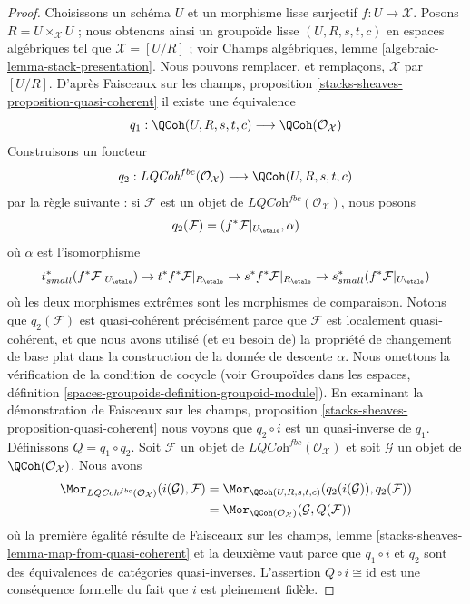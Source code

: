 \begin{proof}
Choisissons un schéma $U$ et un morphisme lisse surjectif $f : U \to \mathcal{X}$.
Posons $R = U \times_\mathcal{X} U$ ; nous obtenons ainsi un groupoïde lisse
$(U, R, s, t, c)$ en espaces algébriques tel que
$\mathcal{X} = [U/R]$ ; voir
Champs algébriques, lemme \ref{algebraic-lemma-stack-presentation}.
Nous pouvons remplacer, et remplaçons, $\mathcal{X}$ par $[U/R]$. D'après
Faisceaux sur les champs, proposition \ref{stacks-sheaves-proposition-quasi-coherent}
il existe une équivalence
$$
q_1 :
\QCoh(U, R, s, t, c)
\longrightarrow
\QCoh(\mathcal{O}_\mathcal{X})
$$
Construisons un foncteur
$$
q_2 :
\textit{LQCoh}^{fbc}(\mathcal{O}_\mathcal{X})
\longrightarrow
\QCoh(U, R, s, t, c)
$$
par la règle suivante : si $\mathcal{F}$ est un objet de
$\textit{LQCoh}^{fbc}(\mathcal{O}_\mathcal{X})$, nous posons
$$
q_2(\mathcal{F}) = (f^*\mathcal{F}|_{U_\etale}, \alpha)
$$
où $\alpha$ est l'isomorphisme
$$
t_{small}^*(f^*\mathcal{F}|_{U_\etale})
\to
t^*f^*\mathcal{F}|_{R_\etale} \to
s^*f^*\mathcal{F}|_{R_\etale} \to
s_{small}^*(f^*\mathcal{F}|_{U_\etale})
$$
où les deux morphismes extrêmes sont les morphismes de comparaison. Notons que
$q_2(\mathcal{F})$ est quasi-cohérent précisément parce que $\mathcal{F}$ est
localement quasi-cohérent, et que nous avons utilisé (et eu besoin de)
la propriété de changement de base plat dans la construction de
la donnée de descente $\alpha$. Nous omettons la
vérification de la condition de cocycle (voir
Groupoïdes dans les espaces, définition
\ref{spaces-groupoids-definition-groupoid-module}).
En examinant la démonstration de
Faisceaux sur les champs, proposition \ref{stacks-sheaves-proposition-quasi-coherent}
nous voyons que $q_2 \circ i$ est un quasi-inverse de $q_1$.
Définissons $Q = q_1 \circ q_2$.
Soit $\mathcal{F}$ un objet de
$\textit{LQCoh}^{fbc}(\mathcal{O}_\mathcal{X})$ et
soit $\mathcal{G}$ un objet de $\QCoh(\mathcal{O}_\mathcal{X})$.
Nous avons
\begin{align*}
\Mor_{\textit{LQCoh}^{fbc}(\mathcal{O}_\mathcal{X})}
(i(\mathcal{G}), \mathcal{F})
& =
\Mor_{\QCoh(U, R, s, t, c)}(q_2(i(\mathcal{G})), q_2(\mathcal{F})) \\
& =
\Mor_{\QCoh(\mathcal{O}_\mathcal{X})}(\mathcal{G}, Q(\mathcal{F}))
\end{align*}
où la première égalité résulte de
Faisceaux sur les champs, lemme \ref{stacks-sheaves-lemma-map-from-quasi-coherent}
et la deuxième vaut parce que $q_1 \circ i$ et $q_2$ sont des équivalences de catégories
quasi-inverses. L'assertion $Q \circ i \cong \text{id}$
est une conséquence formelle du fait que $i$ est pleinement fidèle.
\end{proof}

